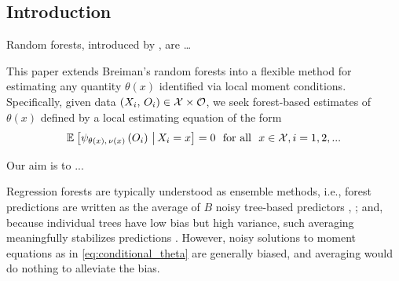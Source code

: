 \documentclass[aos]{imsart}
\theoremstyle{plain}
\theoremstyle{definition}
\theoremstyle{remark}
\begin{document}
\begin{CJK}{UTF8}{gbsn}







\section{Introduction} 
Random forests, introduced by \citet{breiman2001random}, are \dots

This paper extends Breiman's random forests into a flexible
method for estimating any quantity $\theta(x)$ identified via local moment conditions. Specifically,
given data $(X_i, \, O_i) \in \mathcal{X} \times \mathcal{O}$, we seek forest-based estimates of $\theta(x)$ defined by a local
estimating equation of the form
\begin{equation}
\label{eq:conditional_theta}
\EE{\psi_{\theta(x), \, \nu(x)}\p{O_i} \cond X_i = x} = 0 \ \text{ for all } \ x \in \xx, i=1, 2, ... 
\end{equation}

Our aim is to ...

Regression forests are typically understood as ensemble methods, i.e., forest predictions  are written as the average of $B$ noisy tree-based predictors , ; and, because individual trees  have low bias but high variance,
such averaging meaningfully stabilizes predictions \citep{buhlmann2002analyzing,scornet2015consistency}.
However, noisy solutions to moment equations as in \eqref{eq:conditional_theta} are generally biased, and averaging
would do nothing to alleviate the bias.







\end{CJK}
\end{document}
